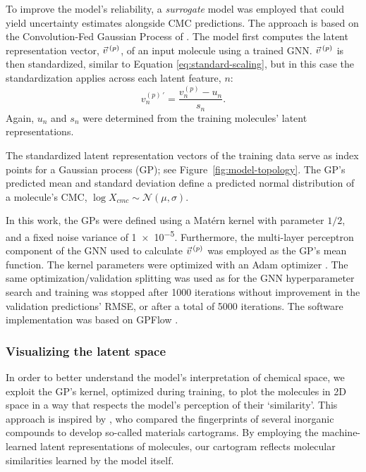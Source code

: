 To improve the model's reliability, a \emph{surrogate} model was employed that
could yield uncertainty estimates alongside CMC predictions. The approach is
based on the Convolution-Fed Gaussian Process of
\citet{tranMethodsComparingUncertainty2020}. The model first computes the latent
representation vector, $\vec{v}^{\,(p)}{}$, of an input molecule using a trained GNN.
$\vec{v}^{\,(p)}{}$ is then standardized, similar to Equation \ref{eq:standard-scaling},
but in this case the standardization applies across each latent feature, $n$:
\begin{equation}
    v^{(p)\,\prime}_n = \frac{v^{(p)}_n - u_n}{s_n}.
\end{equation}
Again, $u_n$ and $s_n$ were determined from the training molecules' latent representations.

The standardized latent representation vectors of the training data serve as index points for a Gaussian process (GP); see Figure~\ref{fig:model-topology}.
The GP's predicted mean and standard deviation define a predicted normal distribution of a molecule's CMC, $\log X_{cmc} \sim \mathcal{N}(\mu, \sigma)$.

In this work, the GPs  were defined using a Mat\'ern kernel with parameter
$1/2$, and a fixed noise variance of \num{1e-5}. Furthermore, the multi-layer
perceptron component of the GNN used to calculate $\vec{v}^{\,(p)}{}$ was employed as the
GP's mean function. The kernel parameters were optimized with an Adam optimizer
\cite{kingmaAdamMethodStochastic2017}. The same optimization/validation
splitting was used as for the GNN hyperparameter search and training was stopped
after \num{1000} iterations without improvement in the validation predictions'
RMSE, or after a total of \num{5000} iterations. The software implementation was
based on GPFlow \cite{matthewsGPflowGaussianProcess2017}.

\subsubsection{Visualizing the latent space}

In order to better understand the model's interpretation of chemical space, we
exploit the GP's kernel, optimized during training, to plot the molecules in 2D
space in a way that respects the model's perception of their `similarity'. This
approach is inspired by \citet{isayevMaterialsCartographyRepresenting2015}, who
compared the fingerprints of several inorganic compounds to develop so-called
materials cartograms. By employing the machine-learned latent representations of
molecules, our cartogram reflects molecular similarities learned by the model
itself.

